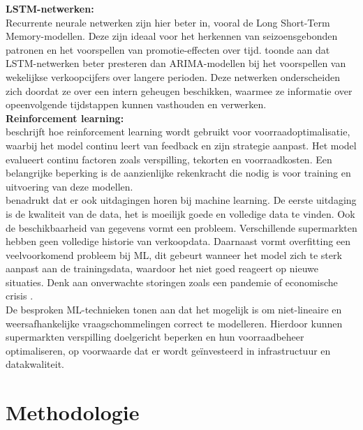 \documentclass{hogent-article}
\begin{document}
    \textbf{LSTM-netwerken:}\\
    
    Recurrente neurale netwerken zijn hier beter in, vooral de Long Short-Term Memory-modellen. Deze zijn ideaal voor het herkennen van seizoensgebonden patronen en het voorspellen van promotie-effecten over tijd. \textcite{Zhang2017} toonde aan dat LSTM-netwerken beter presteren dan ARIMA-modellen bij het voorspellen van wekelijkse verkoopcijfers over langere perioden. Deze netwerken onderscheiden zich doordat ze over een intern geheugen beschikken, waarmee ze informatie over opeenvolgende tijdstappen kunnen vasthouden en verwerken.\\
    
    \textbf{Reinforcement learning:}\\
    
    \textcite{Pilarski2024} beschrijft hoe reinforcement learning wordt gebruikt voor voorraadoptimalisatie, waarbij het model continu leert van feedback en zijn strategie aanpast. Het model evalueert continu factoren zoals verspilling, tekorten en voorraadkosten. Een belangrijke beperking is de aanzienlijke rekenkracht die nodig is voor training en uitvoering van deze modellen.\\
    
    \textcite{Pilarski2024} benadrukt dat er ook uitdagingen horen bij machine learning. De eerste uitdaging is de kwaliteit van de data, het is moeilijk goede en volledige data te vinden. Ook de beschikbaarheid van gegevens vormt een probleem. Verschillende supermarkten hebben geen volledige historie van verkoopdata. Daarnaast vormt overfitting een veelvoorkomend probleem bij ML, dit gebeurt wanneer het model zich te sterk aanpast aan de trainingsdata, waardoor het niet goed reageert op nieuwe situaties. Denk aan onverwachte storingen zoals een pandemie of economische crisis \autocite{Liu2021}.\\
    
    De besproken ML-technieken tonen aan dat het mogelijk is om niet-lineaire en weersafhankelijke vraagschommelingen correct te modelleren. Hierdoor kunnen supermarkten verspilling doelgericht beperken en hun voorraadbeheer optimaliseren, op voorwaarde dat er wordt geïnvesteerd in infrastructuur en datakwaliteit.
    
    \section{Methodologie}
    
\end{document}
